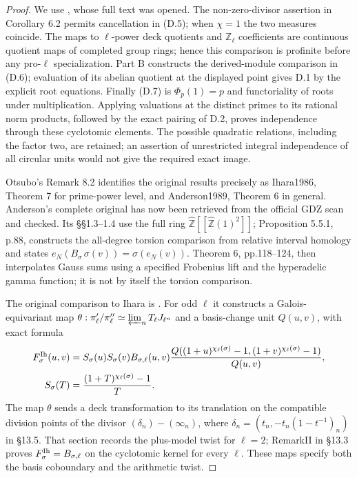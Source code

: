 \begin{proof}
We use \cite[Theorem 6.1, Corollary 6.2, equation(7.2)]{Otsubo2016}, whose full text was opened. The non-zero-divisor assertion in Corollary 6.2 permits cancellation in (D.5); when $\chi=1$ the two measures coincide. The maps to $\ell$-power deck quotients and $\mathbb Z_\ell$ coefficients are continuous quotient maps of completed group rings; hence this comparison is profinite before any pro-$\ell$ specialization. Part B constructs the derived-module comparison in (D.6); evaluation of its abelian quotient at the displayed point gives D.1 by the explicit root equations. Finally (D.7) is $\Phi_p(1)=p$ and functoriality of roots under multiplication. Applying valuations at the distinct primes to its rational norm products, followed by the exact pairing of D.2, proves independence through these cyclotomic elements. The possible quadratic relations, including the factor two, are retained; an assertion of unrestricted integral independence of all circular units would not give the required exact image.

Otsubo's Remark 8.2 identifies the original results precisely as Ihara1986, Theorem 7 for prime-power level, and Anderson1989, Theorem 6 in general. Anderson's complete original has now been retrieved from the official GDZ scan and checked. Its \S\S1.3--1.4 use the full ring
$\widehat{\mathbb Z}[[\widehat{\mathbb Z}(1)^2]]$;
Proposition 5.5.1, p.88, constructs the all-degree torsion comparison from relative interval homology and states
$e_N(B_\sigma\,\sigma(v))=\sigma(e_N(v))$.
Theorem 6, pp.118--124, then interpolates Gauss sums using a specified Frobenius lift and the hyperadelic gamma function; it is not by itself the torsion comparison.

The original comparison to Ihara is \cite[Proposition 13.3.2 and \S\S13.4--13.6]{dAnderson1989}.
For odd $\ell$ it constructs a Galois-equivariant map
$\theta:\pi_\ell'/\pi_\ell''\simeq
\varprojlim_n T_\ell J_{\ell^n}$ and a basis-change unit
$Q(u,v)$, with exact formula
\[
\begin{aligned}
 F^{\rm Ih}_\sigma(u,v)&=S_\sigma(u)S_\sigma(v)
 B_{\sigma,\ell}(u,v)
 \frac{Q((1+u)^{\chi_\ell(\sigma)}-1,
          (1+v)^{\chi_\ell(\sigma)}-1)}{Q(u,v)},\\
 S_\sigma(T)&=\frac{(1+T)^{\chi_\ell(\sigma)}-1}{T}.
\end{aligned}
\]
The map $\theta$ sends a deck transformation to its translation
on the compatible division points of the divisor
$(\delta_n)-(\infty_n)$, where
$\delta_n=(t_n,-t_n(1-t^{-1})_n)$ in \S13.5.
That section records the plus-model twist for $\ell=2$;
RemarkII in \S13.3 proves $F^{\rm Ih}_\sigma=B_{\sigma,\ell}$
on the cyclotomic kernel for every $\ell$.
These maps specify both the basis coboundary and the arithmetic twist.


\end{proof}
